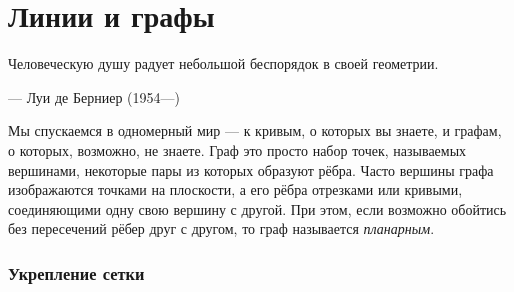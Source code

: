 \chapter{Линии и графы}

\setlength{\epigraphwidth}{.53\textwidth}
\epigraph{Человеческую душу радует небольшой беспорядок в своей геометрии.}{--- Луи де Берниер (1954---)}





Мы спускаемся в одномерный мир --- к кривым, о которых вы знаете, и графам, о которых, возможно, не знаете.
Граф это просто набор точек, называемых вершинами, некоторые пары из которых образуют рёбра.
Часто вершины графа изображаются точками на плоскости, а его рёбра отрезками или кривыми, соединяющими одну свою вершину с другой.
При этом, если возможно обойтись без пересечений рёбер друг с другом, то граф называется \emph{планарным}.

\subsection*{Укрепление сетки}

